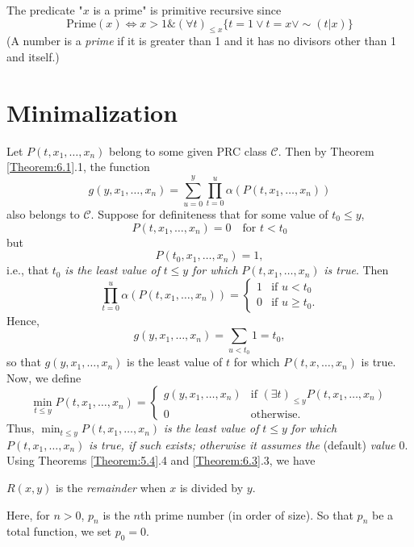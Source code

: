 \documentclass[12pt,a4paper,twoside,openany]{book}
\begin{document}
The predicate "$x$ is a prime" is primitive recursive since $$\text{Prime}(x)\Leftrightarrow x>1\&(\forall t)_{\le x}\{t=1\lor t=x\lor\sim(t|x)\}$$ (A number is a \textit{prime} if it is greater than 1 and it has no divisors other than 1 and itself.)

\section{Minimalization}

Let $P(t,x_1,\ldots,x_n)$ belong to some given PRC class $\mathscr{C}$. Then by Theorem \ref{Theorem:6.1}.1, the function $$g(y,x_1,\ldots,x_n)=\sum_{u=0}^y\prod_{t=0}^u\alpha(P(t,x_1,\ldots,x_n))$$ also belongs to $\mathscr{C}$. Suppose for definiteness that for some value of $t_0\le y$, $$P(t,x_1,\ldots,x_n)=0\quad\text{for }t<t_0$$ but $$P(t_0,x_1,\ldots,x_n)=1,$$ i.e., that $t_0$ \textit{is the least value of} $t\le y$ \textit{for which} $P(t,x_1,\ldots,x_n)$ \textit{is true}. Then $$\prod_{t=0}^u\alpha(P(t,x_1,\ldots,x_n))=\left\{\begin{array}{ll}1&\text{if }u<t_0\\0&\text{if }u\ge t_0.\end{array}\right.$$ Hence, $$g(y,x_1,\ldots,x_n)=\sum_{u<t_0}1=t_0,$$ so that $g(y,x_1,\ldots,x_n)$ is the least value of $t$ for which $P(t,x,\ldots,x_n)$ is true. Now, we define $$\min_{t\le y}P(t,x_1,\ldots,x_n)=\left\{\begin{array}{ll}g(y,x_1,\ldots,x_n)&\text{if }(\exists t)_{\le y}P(t,x_1,\ldots,x_n)\\0&\text{otherwise}.\end{array}\right.$$ Thus, $\min_{t\le y}P(t,x_1,\ldots,x_n)$ \textit{is the least value of} $t\le y$ \textit{for which} $P(t,x_1,\ldots,x_n)$ \textit{is true, if such exists; otherwise it assumes the} (default) \textit{value} 0. Using Theorems \ref{Theorem:5.4}.4 and \ref{Theorem:6.3}.3, we have


$R(x,y)$ is the \textit{remainder} when $x$ is divided by $y$.

Here, for $n>0$, $p_n$ is the $n$th prime number (in order of size). So that $p_n$ be a total function, we set $p_0=0$.
\end{document}
